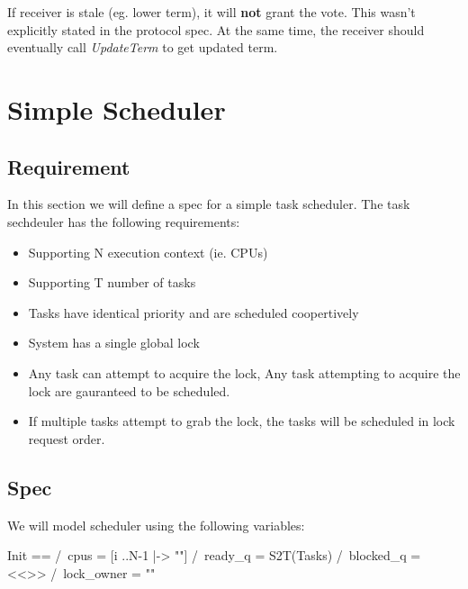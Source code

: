 \documentclass{report}
\begin{document}
If receiver is stale (eg. lower term), it will \textbf{not} grant the vote.
This wasn't explicitly stated in the protocol spec. At the same time, the
receiver should eventually call \textit{UpdateTerm} to get updated term. 

\chapter{Simple Scheduler}

\section{Requirement}

In this section we will define a spec for a simple task scheduler. The task sechdeuler has the following
requirements:
\begin{itemize}
    \item Supporting N execution context (ie. CPUs)
    \item Supporting T number of tasks
    \item Tasks have identical priority and are scheduled coopertively
    \item System has a single global lock
    \item Any task can attempt to acquire the lock, Any task attempting to
    acquire the lock are gauranteed to be scheduled.
    \item If multiple tasks attempt to grab the lock, the tasks will be
    scheduled in lock request order. 
\end{itemize}

\section{Spec}

We will model scheduler using the following variables:\newline
\begin{tla}
Init ==
    /\ cpus = [i ..N-1 |-> ""] 
    /\ ready_q = S2T(Tasks)
    /\ blocked_q = <<>>
    /\ lock_owner = ""
\end{tla}
\begin{tlatex}
%
%
%
%
\end{tlatex}
\newline
\end{document}
